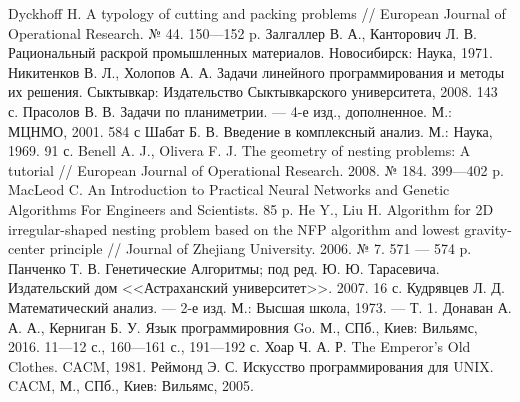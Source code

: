 \documentclass[14pt]{extarticle}
\begin{document}
	\begin{thebibliography}{1}
		 Dyckhoff H. A typology of cutting and packing problems // European Journal of Operational Research. № 44. 150---152 p.
		 Залгаллер В. А., Канторович Л. В. Рациональный раскрой промышленных материалов. Новосибирск: Наука, 1971.
		 Никитенков В. Л., Холопов А. А. Задачи линейного программирования и методы их решения. Сыктывкар: Издательство Сыктывкарского университета, 2008. 143 с.
		  Прасолов В. В. Задачи по планиметрии. --- 4-е изд., дополненное. М.: МЦНМО, 2001. 584 с 
		 Шабат Б. В. Введение в комплексный анализ. М.: Наука, 1969. 91 с.
		 Benell A. J., Olivera F. J. The geometry of nesting problems: A tutorial // European Journal of Operational Research. 2008. № 184. 399---402 p.
		 MacLeod C. An Introduction to Practical Neural Networks and Genetic Algorithms For Engineers and Scientists. 85 p.
		 He Y., Liu H. Algorithm for 2D irregular-shaped nesting problem based on the NFP algorithm and lowest gravity-center principle // Journal of Zhejiang University. 2006. № 7. 571 --- 574 p.
		 Панченко Т. В. Генетические Алгоритмы; под ред. Ю. Ю. Тарасевича. Издательский дом <<Астраханский университет>>. 2007. 16 с.
		 Кудрявцев Л. Д. Математический анализ. --- 2-е изд.  М.: Высшая школа, 1973. --- Т. 1.
		 Донаван А. А. А., Керниган Б. У. Язык программировния Go. М., СПб., Киев: Вильямс, 2016. 11---12 с., 160---161 с., 191---192 с.
		 Хоар Ч. А. Р. The Emperor’s Old Clothes. CACM, 1981.
		 Реймонд Э. С. Искусство программирования для UNIX. CACM, М., СПб., Киев: Вильямс, 2005.
	\end{thebibliography}
\end{document}
